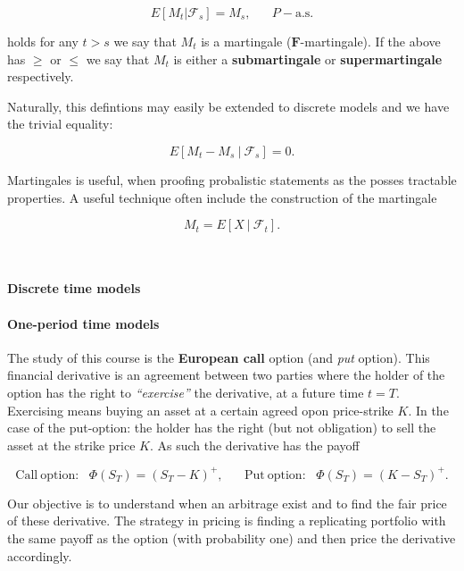 \documentclass[
]{article}
\begin{document}
\[E[M_t\vert \mathcal{F}_s]=M_s,\hspace{20pt}P-\text{a.s.}\]

holds for any \(t>s\) we say that \(M_t\) is a martingale
(\(\mathbf{F}\)-martingale). If the above has \(\ge\) or \(\le\) we say
that \(M_t\) is either a \textbf{submartingale} or
\textbf{supermartingale} respectively.

Naturally, this defintions may easily be extended to discrete models and
we have the trivial equality:

\[E[M_t-M_s\ \vert\ \mathcal{F}_s]=0.\]

Martingales is useful, when proofing probalistic statements as the
posses tractable properties. A useful technique often include the
construction of the martingale

\[M_t=E[X\ \vert\ \mathcal{F}_t].\]

~

\hypertarget{discrete-time-models}{%
\paragraph{Discrete time models}\label{discrete-time-models}}

\hypertarget{one-period-time-models}{%
\paragraph{One-period time models}\label{one-period-time-models}}

The study of this course is the \textbf{European call} option (and
\emph{put} option). This financial derivative is an agreement between
two parties where the holder of the option has the right to
\emph{``exercise''} the derivative, at a future time \(t=T\). Exercising
means buying an asset at a certain agreed opon price-strike \(K\). In
the case of the put-option: the holder has the right (but not
obligation) to sell the asset at the strike price \(K\). As such the
derivative has the payoff

\[\text{Call}\ \text{option:}\hspace{10pt}\Phi(S_T)=(S_T-K)^+,\hspace{20pt}\text{Put}\ \text{option:}\hspace{10pt}\Phi(S_T)=(K-S_T)^+.\]

Our objective is to understand when an arbitrage exist and to find the
fair price of these derivative. The strategy in pricing is finding a
replicating portfolio with the same payoff as the option (with
probability one) and then price the derivative accordingly.
\end{document}
